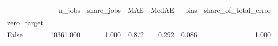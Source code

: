 \begin{tabular}{lrrrrrr}
\toprule
 & n_jobs & share_jobs & MAE & MedAE & bias & share_of_total_error \\
zero_target &  &  &  &  &  &  \\
\midrule
False & 10361.000 & 1.000 & 0.872 & 0.292 & 0.086 & 1.000 \\
\bottomrule
\end{tabular}
